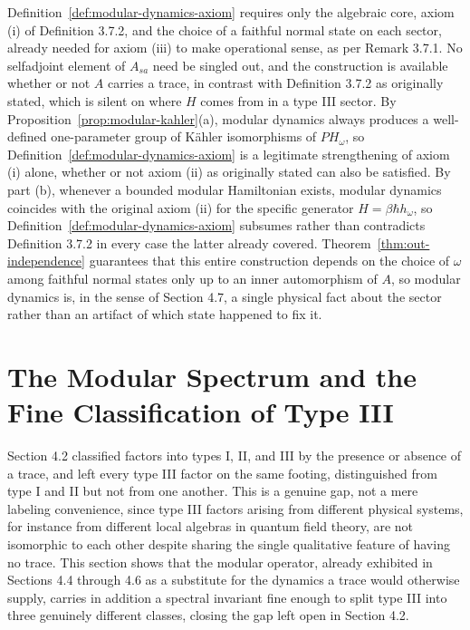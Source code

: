 \begin{remark}
	Definition~\ref{def:modular-dynamics-axiom} requires only the algebraic core, axiom (i) of Definition 3.7.2, and the choice of a faithful normal state on each sector, already needed for axiom (iii) to make operational sense, as per Remark 3.7.1. No selfadjoint element of $A_{sa}$ need be singled out, and the construction is available whether or not $A$ carries a trace, in contrast with Definition 3.7.2 as originally stated, which is silent on where $H$ comes from in a type III sector. By Proposition~\ref{prop:modular-kahler}(a), modular dynamics always produces a well-defined one-parameter group of Kähler isomorphisms of $PH_\omega$, so Definition~\ref{def:modular-dynamics-axiom} is a legitimate strengthening of axiom (i) alone, whether or not axiom (ii) as originally stated can also be satisfied. By part (b), whenever a bounded modular Hamiltonian exists, modular dynamics coincides with the original axiom (ii) for the specific generator $H=\beta\hbar h_\omega$, so Definition~\ref{def:modular-dynamics-axiom} subsumes rather than contradicts Definition 3.7.2 in every case the latter already covered. Theorem~\ref{thm:out-independence} guarantees that this entire construction depends on the choice of $\omega$ among faithful normal states only up to an inner automorphism of $A$, so modular dynamics is, in the sense of Section 4.7, a single physical fact about the sector rather than an artifact of which state happened to fix it.
\end{remark}

\section{The Modular Spectrum and the Fine Classification of Type III}\label{sec:modular-spectrum}

Section 4.2 classified factors into types I, II, and III by the presence or absence of a trace, and left every type III factor on the same footing, distinguished from type I and II but not from one another. This is a genuine gap, not a mere labeling convenience, since type III factors arising from different physical systems, for instance from different local algebras in quantum field theory, are not isomorphic to each other despite sharing the single qualitative feature of having no trace. This section shows that the modular operator, already exhibited in Sections 4.4 through 4.6 as a substitute for the dynamics a trace would otherwise supply, carries in addition a spectral invariant fine enough to split type III into three genuinely different classes, closing the gap left open in Section 4.2.


